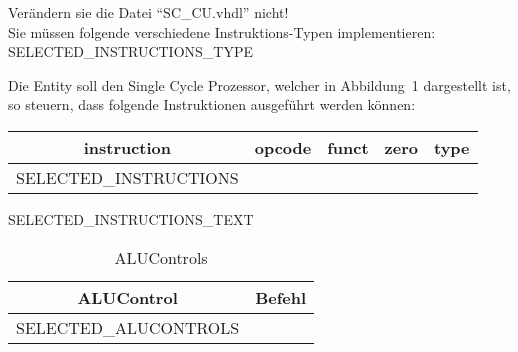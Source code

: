 \documentclass[a4paper,12pt]{article}
\newcommand\Tstrut{\rule{0pt}{2.6ex}}       %
\begin{document}
Ver\"andern sie die Datei "`SC\_CU.vhdl"' nicht!
\\

Sie m\"ussen folgende verschiedene Instruktions-Typen implementieren:
{{SELECTED_INSTRUCTIONS_TYPE}}

Die Entity soll den Single Cycle Prozessor, welcher in Abbildung~1 dargestellt ist, so steuern, dass folgende Instruktionen ausgef\"uhrt werden k\"onnen:

\begin{table}[h!]
\centering
    \begin{tabular}{|c|c|c|c|c|} \hline \Tstrut
		instruction & opcode  & funct	& zero & type   \\ \hline \Tstrut
		{{SELECTED_INSTRUCTIONS}}
    \hline
    \end{tabular}
\end{table}

{{SELECTED_INSTRUCTIONS_TEXT}}

\begin{table}[h!]
\centering
    \begin{tabular}{|c|c|} \hline \Tstrut
		ALUControl & Befehl   \\ \hline \Tstrut
		{{SELECTED_ALUCONTROLS}}
    \hline
    \end{tabular}
    \caption{ALUControls}
    \label{tab:ALUControls}
\end{table}
\end{document}
